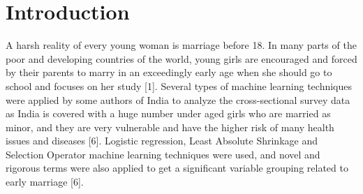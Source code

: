 \documentclass{article}
\begin{document}
\section{Introduction}
    A harsh reality of every young woman is marriage before 18. In many parts of the poor and developing countries of the world, young girls are encouraged and forced by their parents to marry in an exceedingly early age when she should go to school and focuses on her study [1]. Several types of machine learning techniques were applied by some authors of India to analyze the cross-sectional survey data as India is covered with a huge number under aged girls who are married as minor, and they are very vulnerable and have the higher risk of many health issues and diseases [6]. Logistic regression, Least Absolute Shrinkage and Selection Operator machine learning techniques were used, and novel and rigorous terms were also applied to get a significant variable grouping related to early marriage [6]. \\\\
\end{document}
